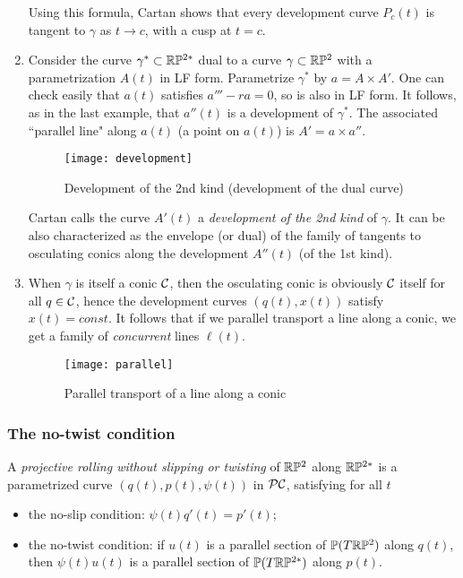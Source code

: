 \begin{enumerate}[leftmargin=18pt,label=(\arabic*)]
Using this formula, Cartan shows that every development curve $P_c(t)$ is tangent to  $\gamma$ as $t\to c$, with a cusp at $t=c$. 



\item    Consider the  curve $\gamma^*\subset \mathbb{R}\mathbb{P}^{2*}$ dual to a curve $\gamma\subset\mathbb{R}\mathbb{P}^2$ with a parametrization $A(t)$ in LF form. Parametrize $\gamma^*$  by $a =A\times A'$. One can check easily that $a(t)$ satisfies $a'''-ra=0$, so is also in LF form. It follows, as  in the last example,  that $a''(t)$ is a  development  of $\gamma^*$. The associated   ``parallel line"  along $a(t)$ (a point on $a(t)$) is $A'=a\times a''$. 

\begin{figure}[h]\centering
\texttt{[image: development]}
\caption{Development of the 2nd kind (development of the dual curve)}
\end{figure}

\begin{rmrk} Cartan calls the curve $A'(t)$ a {\em development of the 2nd kind} of $\gamma$.  It can be also characterized as the envelope (or dual) of the family of tangents to osculating conics along the development  $A''(t)$ (of the 1st kind). 
\end{rmrk}


  



\item    When $\gamma$ is itself a conic $\mathcal{C}$, then the osculating conic is obviously $\mathcal{C}$ itself for all $q\in \mathcal{C}$, hence  the  development curves $(q(t),x(t))$ satisfy  $x(t)=const$. It follows that  if we parallel transport a line along a conic, we get a family of {\em concurrent} lines $\ell(t). $
\begin{figure}[h]\centering
\texttt{[image: parallel]}
\caption{Parallel transport of a line along a conic}
\end{figure}

\end{enumerate}




\subsubsection{The no-twist condition} 

\begin{definition}
A {\em projective rolling without slipping or twisting} of $\mathbb{R}\mathbb{P}^2$ along $\mathbb{R}\mathbb{P}^{2*}$ is a parametrized curve $(q(t), p(t), \psi(t))$ in $\mathcal{PC}$, satisfying for all $t$

\begin{itemize}
\item the no-slip condition: $\psi(t)q'(t)=p'(t)$;


\item the no-twist condition: if $u(t)$ is a parallel section of $\mathbb{P}(T\mathbb{R}\mathbb{P}^2)$ along $q(t)$,  then $\psi(t)u(t)$ is a parallel section of 
 $\mathbb{P}(T\mathbb{R}\mathbb{P}^{2*})$ along  $p(t)$. 
\end{itemize}
\end{definition}


